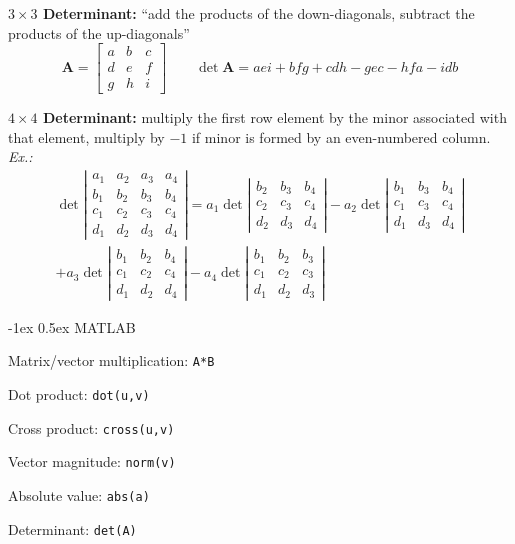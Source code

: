 \documentclass[10pt,landscape]{article}
\makeatletter
\renewcommand{\section}{\@startsection{section}{1}{0mm}%
                                {-1ex}%
                                {0.5ex}%
                                {\normalfont\large\bfseries}}
\makeatother
\begin{document}
\begin{multicols}{3}
\par \textbf{$3 \times 3$ Determinant:} ``add the products of the down-diagonals, subtract the products of the up-diagonals''
\[ \mathbf{A} = \left[\begin{array}{ccc} a & b & c \\ d & e & f \\
g & h & i \end{array}\right] \qquad
\det \mathbf{A} = aei + bfg + cdh - gec - hfa - idb \]

\par \textbf{$4 \times 4$ Determinant:} multiply the first row element by the minor associated with that element, multiply by $-1$ if minor is formed by an even-numbered column. \textit{Ex.:}
{\tiny 
\begin{gather*} \det \left| \begin{array}{cccc} a_1 & a_2 & a_3 & a_4 \\
b_1 & b_2 & b_3 & b_4 \\
c_1 & c_2 & c_3 & c_4 \\
d_1 & d_2 & d_3 & d_4 \end{array} \right|  = a_1 \det\left| \begin{array}{ccc} b_2 & b_3 & b_4 \\ c_2 & c_3 & c_4 \\ d_2 & d_3 & d_4 \end{array} \right|
- a_2 \det\left| \begin{array}{ccc} b_1 & b_3 & b_4 \\ c_1 & c_3 & c_4 \\ d_1 & d_3 & d_4 \end{array} \right| \\ + a_3 \det\left| \begin{array}{ccc} b_1 & b_2 & b_4 \\ c_1 & c_2 & c_4 \\ d_1 & d_2 & d_4 \end{array} \right| - a_4 \det \left| \begin{array}{ccc} b_1 & b_2 & b_3  \\ c_1 & c_2 & c_3 \\ d_1 & d_2 & d_3 \end{array} \right| \end{gather*}
}

\section{MATLAB}
\par Matrix/vector multiplication: \texttt{A*B}
\par Dot product: \texttt{dot(u,v)}
\par Cross product: \texttt{cross(u,v)}
\par Vector magnitude: \texttt{norm(v)}
\par Absolute value: \texttt{abs(a)}
\par Determinant: \texttt{det(A)}


\end{multicols}
\end{document}

